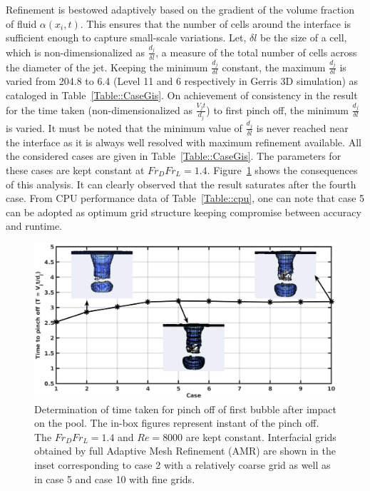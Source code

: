 Refinement is bestowed adaptively based on the gradient of the volume fraction of fluid $\alpha(x_i,t)$. This ensures that the number of cells around the interface is sufficient enough to capture small-scale variations. Let, $\delta l$ be the size of a cell, which is non-dimensionalized as $\frac{d_j}{\delta l}$, a measure of the total number of cells across the diameter of the jet. Keeping the minimum $\frac{d_j}{\delta l}$ constant, the maximum $\frac{d_j}{\delta l}$ is varied from 204.8 to 6.4 (Level 11 and 6 respectively in Gerris 3D simulation) as cataloged in Table~\ref{Table::CaseGis}. On achievement of consistency in the result for the time taken (non-dimensionalized as $\frac{V_jt}{d_j}$) to first pinch off, the minimum $\frac{d_j}{\delta l}$ is varied. It must be noted that the minimum value of $\frac{d_j}{\delta l}$ is never reached near the interface as it is always well resolved with maximum refinement available. All the considered cases are given in Table~\ref{Table::CaseGis}. The parameters for these cases are kept constant at $Fr_DFr_L = 1.4$. Figure~\ref{Figure::GIS} shows the consequences of this analysis. It can clearly observed that the result saturates after the fourth case. From CPU performance data of Table~\ref{Table::cpu}, one can note that case 5 can be adopted as optimum grid structure keeping compromise between accuracy and runtime.\\
\begin{figure}
	\centering
	\includegraphics[width=\linewidth]{chapters/jetPool/Figure4}
	\caption{Determination of time taken for pinch off of first bubble after impact on the pool. The in-box figures represent instant of the pinch off. The $Fr_DFr_L  = 1.4 $ and $Re = 8000$ are kept constant. Interfacial grids obtained by full Adaptive Mesh Refinement (AMR) are shown in the inset corresponding to case 2 with a relatively coarse grid as well as in case 5 and case 10 with fine grids.}
	\label{Figure::GIS}
\end{figure}
